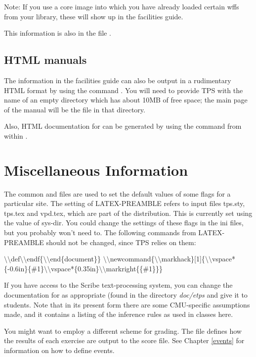 Note: If you use a {\TPS} core image into which you have already loaded
certain wffs from your library, these will show up in the facilities
guide.

This information is also in the file .


\subsection{HTML manuals}

The information in the facilities guide can also be output in a rudimentary HTML format
by using the command . You will need to provide TPS with the name
of an empty directory which has about 10MB of free space; the main page of the manual
will be the file  in that directory.

Also, HTML documentation for {\ETPS} can be generated by using the command
 from within {\ETPS}.

\section{Miscellaneous Information}

The common  and  files are used to set the default values
of some flags for a particular site.
The setting of LATEX-PREAMBLE
refers to input files tps.sty, tps.tex and vpd.tex, which are part of the {\TPS} distribution.
This is currently set using the value of sys-dir.
You could change the settings of these flags in  the ini files, but you probably won't need to.
The following commands from LATEX-PREAMBLE should not be changed, since
TPS relies on them:
\begin{tpsexample}
\(\setminus\setminus\)def\(\setminus\setminus\)endf\{\(\setminus\setminus\)end\{document\}\}
\(\setminus\setminus\)newcommand\{\(\setminus\setminus\)markhack\}[1]\{\(\setminus\setminus\)vspace*\{-0.6in\}\{\#1\}\(\setminus\setminus\)vspace*\{0.35in\}\(\setminus\setminus\)markright\{\{\#1\}\}\}
\end{tpsexample}


If you have access to the Scribe text-processing system,
you can change the documentation for {\ETPS} as appropriate (found in
the directory {\it doc/etps} and give it to students.  Note that in
its present form there are some CMU-specific assumptions made,
and it contains a listing of the inference rules as used in classes here.

You might want to employ a different scheme for grading.  The file
 defines how the results of each exercise are
output to the score file.  See Chapter \ref{events} for information
on how to define events.
